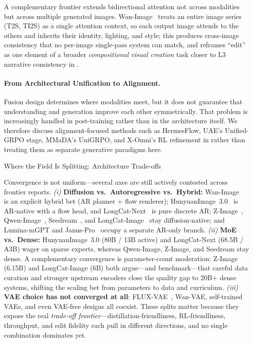 \documentclass{llmxive}
\begin{document}
A complementary frontier extends bidirectional attention not across modalities but across multiple generated images. Wan-Image~\citep{mao2026wan} treats an entire image series (T2S, TI2S) as a single attention context, so each output image attends to the others and inherits their identity, lighting, and style; this produces cross-image consistency that no per-image single-pass system can match, and reframes ``edit'' as one element of a broader \emph{compositional visual creation} task closer to L3 narrative consistency in .

\paragraph{From Architectural Unification to Alignment.}
Fusion design determines where modalities meet, but it does not guarantee that understanding and generation improve each other symmetrically. That problem is increasingly handled in post-training rather than in the architecture itself. We therefore discuss alignment-focused methods such as HermesFlow, UAE's Unified-GRPO stage, MMaDA's UniGRPO, and X-Omni's RL refinement in  rather than treating them as separate generative paradigms here.


\begin{highlightbox}{Where the Field Is Splitting: Architecture Trade-offs}

Convergence is not uniform---several axes are still actively contested across frontier reports. \emph{(i)} \textbf{Diffusion vs.\ Autoregressive vs.\ Hybrid:} Wan-Image~\citep{mao2026wan} is an explicit hybrid bet (AR planner + flow renderer); HunyuanImage~3.0~\citep{cao2025hunyuanimage} is AR-native with a flow head, and LongCat-Next~\citep{team2026longcat} is pure discrete AR; Z-Image~\citep{cai2025z}, Qwen-Image~\citep{wu2025qwen}, Seedream~\citep{seedream2025seedream}, and LongCat-Image~\citep{team2025longcat} stay diffusion-native; and Lumina-mGPT and Janus-Pro~\citep{chen2025janusprounifiedmultimodalunderstanding} occupy a separate AR-only branch. \emph{(ii)} \textbf{MoE vs.\ Dense:} HunyuanImage~3.0 (80B / 13B active) and LongCat-Next (68.5B / A3B) wager on sparse experts, whereas Qwen-Image, Z-Image, and Seedream stay dense. A complementary convergence is parameter-count moderation: Z-Image (6.15B) and LongCat-Image (6B) both argue---and benchmark---that careful data curation and stronger upstream encoders close the quality gap to 20B+ dense systems, shifting the scaling bet from parameters to data and curriculum. \emph{(iii)} \textbf{VAE choice has not converged at all}: FLUX-VAE~\citep{labs2025flux1kontextflowmatching}, Wan-VAE, self-trained VAEs, and even VAE-free designs all coexist. These splits matter because they expose the real \emph{trade-off frontier}---distillation-friendliness, RL-friendliness, throughput, and edit fidelity each pull in different directions, and no single combination dominates yet.
\end{highlightbox}
\end{document}
